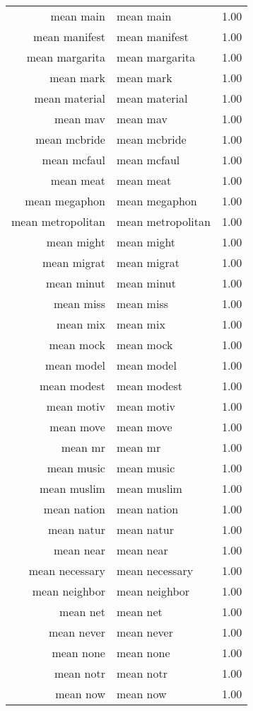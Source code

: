 \begin{table}[ht]
\begin{tabular}{rlr}
  mean main & mean main & 1.00 \\ 
  mean manifest & mean manifest & 1.00 \\ 
  mean margarita & mean margarita & 1.00 \\ 
  mean mark & mean mark & 1.00 \\ 
  mean material & mean material & 1.00 \\ 
  mean mav & mean mav & 1.00 \\ 
  mean mcbride & mean mcbride & 1.00 \\ 
  mean mcfaul & mean mcfaul & 1.00 \\ 
  mean meat & mean meat & 1.00 \\ 
  mean megaphon & mean megaphon & 1.00 \\ 
  mean metropolitan & mean metropolitan & 1.00 \\ 
  mean might & mean might & 1.00 \\ 
  mean migrat & mean migrat & 1.00 \\ 
  mean minut & mean minut & 1.00 \\ 
  mean miss & mean miss & 1.00 \\ 
  mean mix & mean mix & 1.00 \\ 
  mean mock & mean mock & 1.00 \\ 
  mean model & mean model & 1.00 \\ 
  mean modest & mean modest & 1.00 \\ 
  mean motiv & mean motiv & 1.00 \\ 
  mean move & mean move & 1.00 \\ 
  mean mr & mean mr & 1.00 \\ 
  mean music & mean music & 1.00 \\ 
  mean muslim & mean muslim & 1.00 \\ 
  mean nation & mean nation & 1.00 \\ 
  mean natur & mean natur & 1.00 \\ 
  mean near & mean near & 1.00 \\ 
  mean necessary & mean necessary & 1.00 \\ 
  mean neighbor & mean neighbor & 1.00 \\ 
  mean net & mean net & 1.00 \\ 
  mean never & mean never & 1.00 \\ 
  mean none & mean none & 1.00 \\ 
  mean notr & mean notr & 1.00 \\ 
  mean now & mean now & 1.00 \\ 

\end{tabular}
\end{table}
